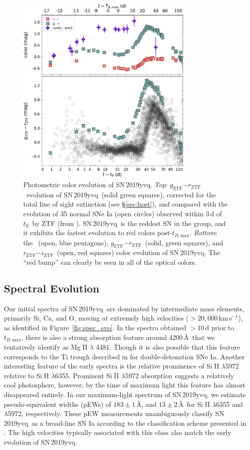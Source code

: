 \documentclass[twocolumn]{aastex63}
\def\ion#1#2{#1$\;${\footnotesize\rm{#2}}\relax}
\newcommand{\rztf}{$r_\mathrm{ZTF}$}
\newcommand{\gztf}{$g_\mathrm{ZTF}$}
\newcommand{\iztf}{$i_\mathrm{ZTF}$}
\newcommand{\tfl}{$t_\mathrm{fl}$}
\newcommand{\tbmax}{$t_{B,\mathrm{max}}$}
\newcommand{\kms}{km\,s$^{-1}$}
\newcommand{\sn}{SN\,2019yvq}
\begin{document}
\begin{figure}
    \centering
    \includegraphics[width=3.5in]{./figures/P48_colors.pdf}
    \caption{Photometric color evolution of \sn. \textit{Top}: \gztf$ -
    $\rztf\ evolution of \sn\ (solid green squares), corrected for the total
    line of sight extinction (see \S\ref{sec:host}), and compared with the
    evolution of 35 normal SNe Ia (open circles) observed within 3\,d of
    \tfl\ by ZTF (from \citealt{Bulla20}). \sn\ is the reddest SN in the
    group, and it exhibits the fastest evolution to red colors post-\tbmax.
    \textit{Bottom}: the \bv\ (open, blue pentagons), \gztf$ - $\rztf\
    (solid, green squares), and \rztf$ - $\iztf\ (open, red squares) color
    evolution of \sn. The ``red bump'' can clearly be seen in all of the
    optical colors.}
    \label{fig:colors}
\end{figure}

\subsection{Spectral Evolution}\label{sec:spec}

Our initial spectra of \sn\ are dominated by intermediate mass elements,
primarily Si, Ca, and O, moving at extremely high velocities ($>
20,000$\,\kms), as identified in Figure~\ref{fig:spec_evo}. In the spectra
obtained $>$10\,d prior to \tbmax, there is also a strong absorption feature
around 4200\,\AA\ that we tentatively identify as \ion{Mg}{II} $\lambda$
4481. Though it is also possible that this feature corresponds to the Ti
trough described in \citet{Polin19} for double-detonation SNe Ia. Another
interesting feature of the early spectra is the relative prominence of
\ion{Si}{II} $\lambda$5972 relative to \ion{Si}{II} $\lambda$6355. Prominent
\ion{Si}{II} $\lambda$5972 absorption suggests a relatively cool photosphere,
however, by the time of maximum light this feature has almost disappeared
entirely. In our maximum-light spectrum of \sn, we estimate pseudo-equivalent
widths (pEWs) of $183\pm1$\,\AA, and $13\pm2$\,\AA\ for \ion{Si}{II}
$\lambda$6355 and $\lambda$5972, respectively. These pEW measurements
unambiguously classify \sn\ as a broad-line SN Ia according to the
classification scheme presented in \citet{Branch06}. The high velocities
typically associated with this class also match the early evolution of \sn.
\end{document}
